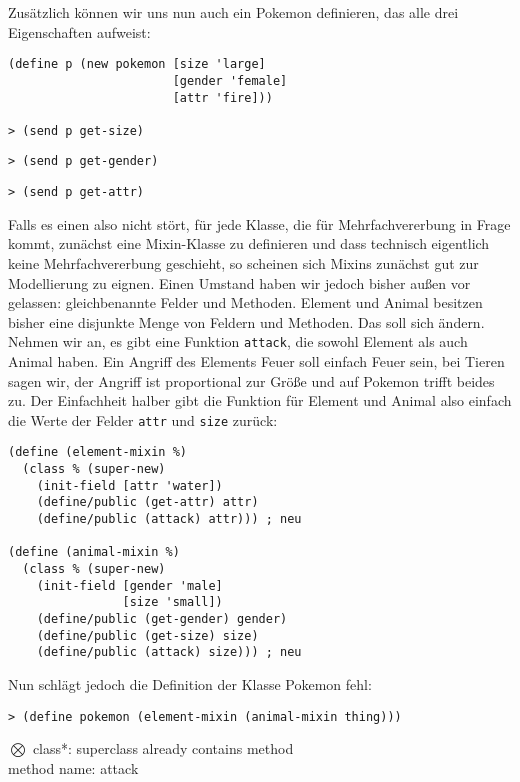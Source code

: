 Zusätzlich können wir uns nun auch ein Pokemon definieren, das alle drei Eigenschaften aufweist:
\begin{lstlisting}
(define p (new pokemon [size 'large]
                       [gender 'female]
                       [attr 'fire]))
 
> (send p get-size)
\end{lstlisting}
{}
\begin{lstlisting}
> (send p get-gender)
\end{lstlisting}
{}
\begin{lstlisting}
> (send p get-attr)
\end{lstlisting}
{}

Falls es einen also nicht stört, für jede Klasse, die für Mehrfachvererbung in Frage kommt, zunächst eine Mixin-Klasse zu definieren und dass technisch eigentlich keine Mehrfachvererbung geschieht, so scheinen sich Mixins zunächst gut zur Modellierung zu eignen. Einen Umstand haben wir jedoch bisher außen vor gelassen: gleichbenannte Felder und Methoden. Element und Animal besitzen bisher eine disjunkte Menge von Feldern und Methoden. Das soll sich ändern. Nehmen wir an, es gibt eine Funktion \texttt{attack}, die sowohl Element als auch Animal haben. Ein Angriff des Elements Feuer soll einfach Feuer sein, bei Tieren sagen wir, der Angriff ist proportional zur Größe und auf Pokemon trifft beides zu. Der Einfachheit halber gibt die Funktion für Element und Animal also einfach die Werte der Felder \texttt{attr} und \texttt{size} zurück:

\begin{lstlisting}
(define (element-mixin %)
  (class % (super-new)
    (init-field [attr 'water])
    (define/public (get-attr) attr)
    (define/public (attack) attr))) ; neu
 
(define (animal-mixin %)
  (class % (super-new)
    (init-field [gender 'male]
                [size 'small])
    (define/public (get-gender) gender)
    (define/public (get-size) size)
    (define/public (attack) size))) ; neu
\end{lstlisting}

Nun schlägt jedoch die Definition der Klasse Pokemon fehl:

\begin{lstlisting}
> (define pokemon (element-mixin (animal-mixin thing)))
\end{lstlisting}
{\rerror $\bigotimes$ class*: superclass already contains method\\
method name: attack}

